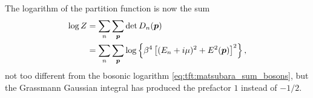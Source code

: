 The logarithm of the partition function is now the sum
\begin{equation}
\begin{split}
	\log Z & = \sum_n \sum_{\bm{p}} \operatorname{det} D_n({\bm{p}}) \\
	       & = \sum_n \sum_{\bm{p}} \log \left\{ \beta^4 \left[ (E_n + i \mu)^2 + E^2({\bm{p}}) \right]^2 \right\} , \\
\end{split}
\end{equation}
not too different from the bosonic logarithm \eqref{eq:tft:matsubara_sum_bosons}, but the Grassmann Gaussian integral has produced the prefactor $1$ instead of $-1/2$.

